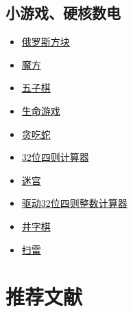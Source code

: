 \section{小游戏、硬核数电}
\begin{itemize}
\item \href{https://www.bilibili.com/video/av38924330}{俄罗斯方块}
\item \href{https://www.bilibili.com/video/av56760618}{魔方}
\item \href{https://www.bilibili.com/video/av93790872}{五子棋}
\item \href{https://www.bilibili.com/video/BV1RP4y1x7qC}{生命游戏}
\item \href{https://www.bilibili.com/video/BV1xK4y1N7DL}{贪吃蛇}
\item \href{https://www.bilibili.com/video/BV1XA411b7aj}{32位四则计算器}
\item \href{https://www.bilibili.com/video/BV1sk4y1m7DE}{迷宫}
\item \href{https://www.bilibili.com/video/BV1fv411v7rp}{驱动32位四则整数计算器}
\item \href{https://www.bilibili.com/video/BV155411P7AQ}{井字棋}
\item \href{https://www.bilibili.com/video/BV17v4y197vk}{扫雷}
\end{itemize}

\chapter{推荐文献}

